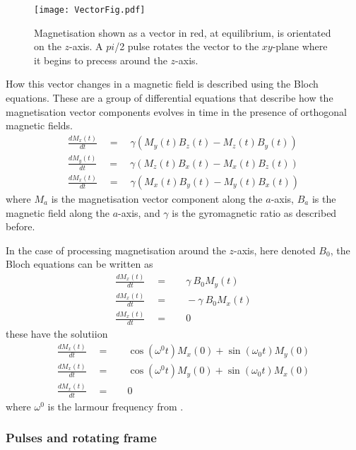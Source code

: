 \begin{figure}
  \begin{center}
  \texttt{[image: VectorFig.pdf]}
  \end{center}
  \caption{Magnetisation shown as a vector in red, at equilibrium, is orientated on the $z$-axis. A $pi$/2
  pulse rotates the vector to the $xy$-plane where it begins to precess around the $z$-axis.}
  \label{fig:VectorFig}
\end{figure}

How this vector changes in a magnetic field is described using the Bloch equations\citep{Bloch:1946hk}. These are a group of differential equations that
describe how the magnetisation vector components evolves in time in the
presence of orthogonal magnetic fields.
\begin{align}\label{eqn:Bloch}
  \frac{dM_x(t)}{dt}\quad=\quad\gamma(M_y(t)B_z(t)-M_z(t)B_y(t))\\
  \frac{dM_y(t)}{dt}\quad=\quad\gamma(M_z(t)B_x(t)-M_x(t)B_z(t))\\
  \frac{dM_x(t)}{dt}\quad=\quad\gamma(M_x(t)B_y(t)-M_y(t)B_x(t))
\end{align}
where $M_a$ is the magnetisation vector component along the $a$-axis, $B_a$ is the
magnetic field along the $a$-axis, and $\gamma$ is the gyromagnetic ratio as described before.

In the case of processing magnetisation around the $z$-axis, here denoted $B_0$, the
Bloch equations can be written as
\begin{align}
  \frac{dM_x(t)}{dt}\quad=&\quad\gamma~B_0M_y(t)\\
  \frac{dM_x(t)}{dt}\quad=&\quad-\gamma~B_0M_x(t)\\
  \frac{dM_x(t)}{dt}\quad=&\quad0
\end{align}
these have the solutiion
\begin{align}
  \frac{dM_x(t)}{dt}\quad=&\quad\cos(\omega^0t)M_x(0) + \sin(\omega_0t)M_y(0)\\
  \frac{dM_x(t)}{dt}\quad=&\quad\cos(\omega^0t)M_y(0) + \sin(\omega_0t)M_x(0)\\
  \frac{dM_x(t)}{dt}\quad=&\quad0
\end{align}
where $\omega^0$ is the larmour frequency from .

\subsubsection{Pulses and rotating frame}

